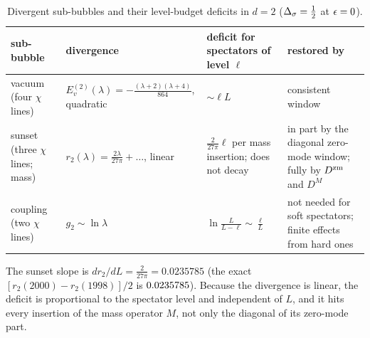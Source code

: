 \begin{table}[ht]
\centering\footnotesize\renewcommand{\arraystretch}{1.15}
\begin{tabular}{@{}p{3.1cm}p{4.3cm}p{3.7cm}p{4.1cm}@{}}
\toprule
sub-bubble & divergence & deficit for spectators of level $\ell$ & restored by \\\midrule
vacuum (four $\chi$ lines) & $E_v^{(2)}(\lambda)=-\frac{(\lambda+2)(\lambda+4)}{864}$, quadratic & ${\sim}\ell L$ & consistent window \\
sunset (three $\chi$ lines; mass) & $r_2(\lambda)=\frac{2\lambda}{27\pi}+\dots$, linear & $\frac2{27\pi}\ell$ per mass insertion; does not decay & in part by the diagonal zero-mode window; fully by $D^{\rm zm}$ and $D^M$ \\
coupling (two $\chi$ lines) & $g_2\sim\ln\lambda$ & $\ln\frac L{L-\ell}\sim\frac\ell L$ & not needed for soft spectators; finite effects from hard ones \\
\bottomrule
\end{tabular}
\caption{Divergent sub-bubbles and their level-budget deficits in $d=2$ ($\Delta_\sigma=\frac12$ at $\epsilon=0$).}
\label{htp:d2:tab:budget}
\end{table}

The sunset slope is $dr_2/dL=\frac2{27\pi}=0.0235785$ (the exact $[r_2(2000)-r_2(1998)]/2$ is $0.0235785$). Because the
divergence is linear, the deficit is proportional to the spectator level and independent of $L$, and it hits every
insertion of the mass operator $M$, not only the diagonal of its zero-mode part.

